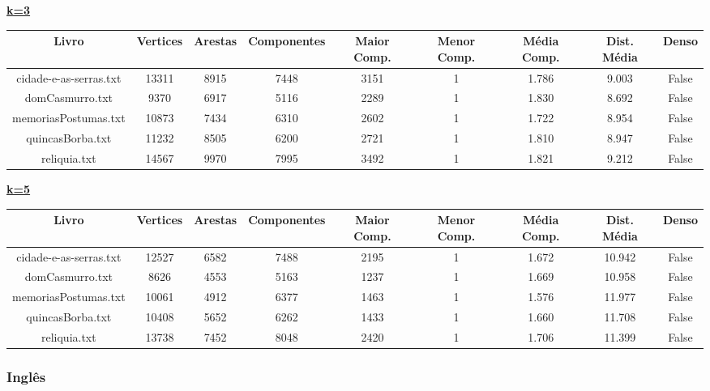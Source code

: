 \documentclass[12pt]{article}
\newcommand{\mytitle}[1]{\textbf{\underline{#1}}}
\begin{document}
\noindent\mytitle{k=3}
\begin{center}
\begin{tabular}{||c | c | c | c | c | c | c | c | c||}
\hline
Livro & Vertices & Arestas & Componentes & Maior Comp. & Menor Comp. & Média Comp. & Dist. Média & Denso \\ [0.5ex]
\hline\hline
cidade-e-as-serras.txt & 13311 & 8915 & 7448 & 3151 & 1 & 1.786 & 9.003 & False \\
\hline
domCasmurro.txt & 9370 & 6917 & 5116 & 2289 & 1 & 1.830 & 8.692 & False \\
\hline
memoriasPostumas.txt & 10873 & 7434 & 6310 & 2602 & 1 & 1.722 & 8.954 & False \\
\hline
quincasBorba.txt & 11232 & 8505 & 6200 & 2721 & 1 & 1.810 & 8.947 & False \\
\hline
reliquia.txt & 14567 & 9970 & 7995 & 3492 & 1 & 1.821 & 9.212 & False \\
\hline
\end{tabular}
\end{center}

\noindent\mytitle{k=5}
\begin{center}
\begin{tabular}{||c | c | c | c | c | c | c | c | c||}
\hline
Livro & Vertices & Arestas & Componentes & Maior Comp. & Menor Comp. & Média Comp. & Dist. Média & Denso \\ [0.5ex]
\hline\hline
cidade-e-as-serras.txt & 12527 & 6582 & 7488 & 2195 & 1 & 1.672 & 10.942 & False \\
\hline
domCasmurro.txt & 8626 & 4553 & 5163 & 1237 & 1 & 1.669 & 10.958 & False \\
\hline
memoriasPostumas.txt & 10061 & 4912 & 6377 & 1463 & 1 & 1.576 & 11.977 & False \\
\hline
quincasBorba.txt & 10408 & 5652 & 6262 & 1433 & 1 & 1.660 & 11.708 & False \\
\hline
reliquia.txt & 13738 & 7452 & 8048 & 2420 & 1 & 1.706 & 11.399 & False \\
\hline
\end{tabular}
\end{center}

\subsubsection{Inglês}
\end{document}
